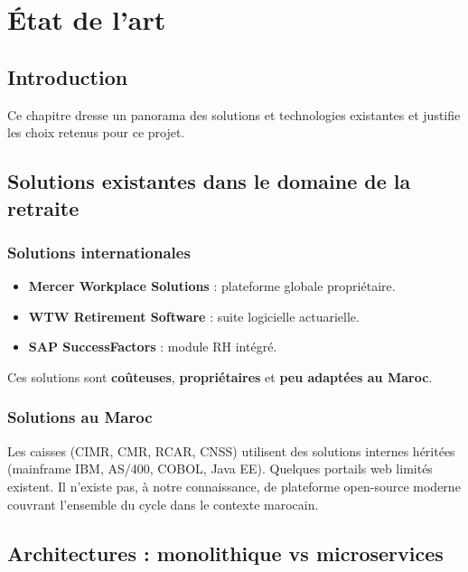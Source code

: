 \documentclass[12pt,a4paper,oneside]{report}
\begin{document}
\chapter{État de l'art}

\section{Introduction}
Ce chapitre dresse un panorama des solutions et technologies existantes et justifie les choix retenus pour ce projet.

\section{Solutions existantes dans le domaine de la retraite}

\subsection{Solutions internationales}
\begin{itemize}
    \item \textbf{Mercer Workplace Solutions} : plateforme globale propriétaire.
    \item \textbf{WTW Retirement Software} : suite logicielle actuarielle.
    \item \textbf{SAP SuccessFactors} : module RH intégré.
\end{itemize}
Ces solutions sont \textbf{coûteuses}, \textbf{propriétaires} et \textbf{peu adaptées au Maroc}.

\subsection{Solutions au Maroc}
Les caisses (CIMR, CMR, RCAR, CNSS) utilisent des solutions internes héritées (mainframe IBM, AS/400, COBOL, Java EE). Quelques portails web limités existent. Il n'existe pas, à notre connaissance, de plateforme open-source moderne couvrant l'ensemble du cycle dans le contexte marocain.

\section{Architectures : monolithique vs microservices}
\end{document}
